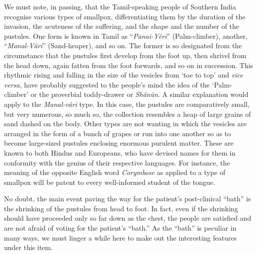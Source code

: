\documentclass[a4paper, 12pt, oneside, english]{article}
\begin{document}
We must note, in passing, that the Tamil-speaking people of Southern India recognise various types of smallpox, differentiating them by the duration of the invasion, the acuteness of the suffering, and the shape and the number of the pustules. One form is known in Tamil as ``\emph{Panai-Yêri}'' (Palm-climber), another, ``\emph{Manal-Vâri}'' (Sand-heaper), and so on. The former is so designated from the circumstance that the pustules first develop from the foot up, then shrivel from the head down, again fatten from the foot forwards, and so on in succession. This rhythmic rising and falling in the size of the vesicles from `toe to top' and \emph{vice versa}, have probably suggested to the people's mind the idea of the `Palm-climber' or the proverbial toddy-drawer or \emph{Shânûn}. A similar explanation would apply to the \emph{Manal-vâri} type. In this case, the pustules are comparatively small, but very numerous, so much so, the collection resembles a heap of large grains of sand dashed on the body. Other types are not wanting in which the vesicles are arranged in the form of a bunch of grapes or run into one another so as to become large-sized pustules enclosing enormous purulent matter. These are known to both Hindus and Europeans, who have devised names for them in conformity with the genius of their respective languages. For instance, the meaning of the opposite English word \emph{Corymbose} as applied to a type of smallpox will be patent to every well-informed student of the tongue.

No doubt, the main event paving the way for the patient's post-clinical ``bath'' is the shrinking of the pustules from head to foot. In fact, even if the shrinking should have proceeded only so far down as the chest, the people are satisfied and are not afraid of voting for the patient's ``bath.'' As the ``bath'' is peculiar in many ways, we must linger a while here to make out the interesting features under this item.
\end{document}
